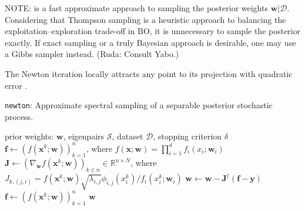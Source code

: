 \documentclass{article}
\newcommand{\cmtR}[1]{\textcolor{red!50!black}{(Ruda: #1)}} %
\begin{document}
NOTE:  is a fast approximate approach to sampling the posterior
weights $\mathbf{w} | \mathcal{D}$. Considering that Thompson sampling
is a heuristic approach to balancing the exploitation--exploration
trade-off in BO, it is unnecessary to sample the posterior exactly. If
exact sampling or a truly Bayesian approach is desirable, one may use a
Gibbs sampler instead. \cmtR{Consult Yabo.}

The Newton iteration locally attracts any point to its
projection with quadratic error \cite{Gatilov2014}.

\begin{algorithm}[h]
  \caption{\texttt{newton}: Approximate spectral sampling
    of a separable posterior stochastic process.}
  \label{alg:newton}
  \begin{algorithmic}[1] %
    \Input prior weights: $\mathbf{w}$, eigenpairs $\mathcal{S}$,
    dataset $\mathcal{D}$, stopping criterion $\delta$
    \State $\mathbf{f} \gets (f(\mathbf{x}^k; \mathbf{w}))_{k=1}^n$, where
    $f(\mathbf{x}; \mathbf{w}) = \prod_{i=1}^d f_i(x_i; \mathbf{w}_i)$
      \State $\mathbf{J} \gets (\nabla_{\mathbf{w}} f(\mathbf{x}^k; \mathbf{w}))_{k \in n}
      \in \mathbb{R}^{n \times N}$, where $J_{k,(j,i)} =
      {f(\mathbf{x}^k; \mathbf{w})} \sqrt{\lambda_{i,j}} \phi_{i,j}(x_i^k) / {f_i(x_i^k; \mathbf{w}_i)}$
      \State $\mathbf{w} \gets \mathbf{w} - \mathbf{J}^\dagger (\mathbf{f} - \mathbf{y})$
      \State $\mathbf{f} \gets (f(\mathbf{x}^k; \mathbf{w}))_{k=1}^n$
    \EndWhile
    \Output $\mathbf{w}$
  \end{algorithmic}
\end{algorithm}
\end{document}
